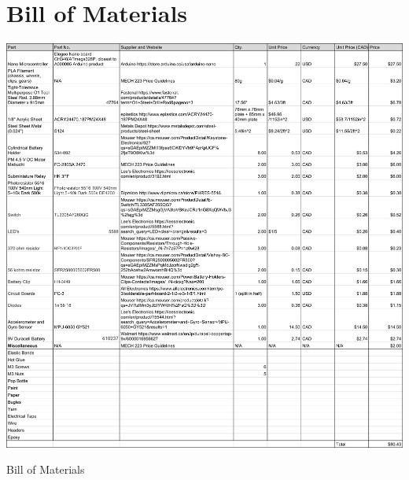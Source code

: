 \documentclass[class=../../report, crop=false]{standalone}
\begin{document}
\section{Bill of Materials} \label{app:bom}
\begin{table}[H]
	\centering
	\includegraphics[width=\textwidth]{../../res/img/bom}
	\caption{Bill of Materials}
	\label{app/table:bom}
\end{table}
	
\end{document}
